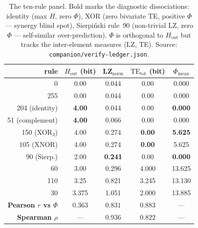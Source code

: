 \documentclass[11pt,a4paper]{article}
\newcommand{\bigphi}{\ensuremath{\Phi}}
\begin{document}
\begin{table}[t]
\centering
\small
\begin{tabular}{r ccc c}
\toprule
\textbf{rule} & \(H_\mathrm{out}\) (bit) & LZ$_\mathrm{norm}$ &
\(\mathrm{TE}_\mathrm{tot}\) (bit) & \(\bigphi_\mathrm{mean}\) \\
\midrule
0   & 0.00 & 0.044 & 0.00 & 0.000 \\
255 & 0.00 & 0.044 & 0.00 & 0.000 \\
204 (identity) & \textbf{4.00} & 0.044 & 0.00 & \textbf{0.000} \\
51  (complement) & \textbf{4.00} & 0.066 & 0.00 & 0.000 \\
150 (XOR$_3$) & 4.00 & 0.274 & \textbf{0.00} & \textbf{5.625} \\
105 (XNOR) & 4.00 & 0.274 & \textbf{0.00} & 5.625 \\
90  (Sierp.) & 2.00 & \textbf{0.241} & 0.00 & \textbf{0.000} \\
60  & 3.00 & 0.296 & 4.000 & 13.625 \\
110 & 3.25 & 0.821 & 3.245 & 13.130 \\
30  & 3.375 & 1.051 & 2.000 & 13.885 \\
\midrule
\multicolumn{1}{r}{\textbf{Pearson \(r\) vs \bigphi{}}}
 & \(0.363\) & \(0.831\) & \(0.883\) & --- \\
\multicolumn{1}{r}{\textbf{Spearman \(\rho\)}}
 & --- & \(0.936\) & \(0.822\) & --- \\
\bottomrule
\end{tabular}
\caption{The ten-rule panel. Bold marks the diagnostic dissociations:
identity (max \(H\), zero \bigphi{}), XOR (zero bivariate TE, positive
\bigphi{} --- synergy blind spot), Sierpi\'nski rule~90 (non-trivial LZ,
zero \bigphi{} --- self-similar over-prediction). \bigphi{} is orthogonal
to \(H_\mathrm{out}\) but tracks the inter-element measures (LZ, TE).
Source: \texttt{companion/verify-ledger.json}.}
\label{tab:panel}
\end{table}
\end{document}
